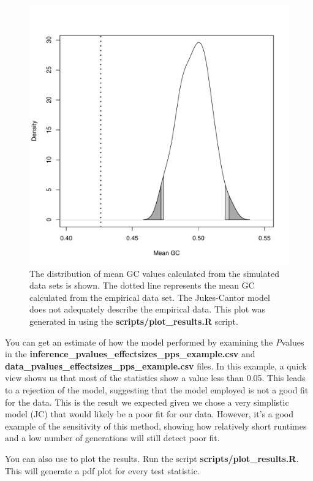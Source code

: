 \begin{figure}[!t]
\centering
\includegraphics[width=\textwidth,angle=0]{figures/mean_gc.pdf}
\caption{\small 
The distribution of mean GC values calculated from the simulated data sets
is shown. The dotted line represents the mean GC calculated from the empirical data set.
The Jukes-Cantor model does not adequately describe the empirical data.
    This plot was generated in \R using the \textbf{scripts/plot\_results.R} script.
    }
\end{figure}

You can get an estimate of how the model performed by examining the \textit{P}\-values in the 
\textbf{inference\_pvalues\_effectsizes\_pps\_example.csv} and \textbf{data\_pvalues\_effectsizes\_pps\_example.csv} files. In this example, a quick view shows us that most of the statistics show a value less than 0.05. This leads to a rejection of the model, suggesting 
that the model employed is not a good fit for the data. This is the result we expected given we chose a very 
simplistic model (JC) that would likely be a poor fit for our data. However, it's a good example 
of the sensitivity of this method, showing how relatively short runtimes and a low number of generations will 
still detect poor fit. 


You can also use \R to plot the results. Run the \R script \textbf{scripts/plot\_results.R}.
This will generate a pdf plot for every test statistic.




